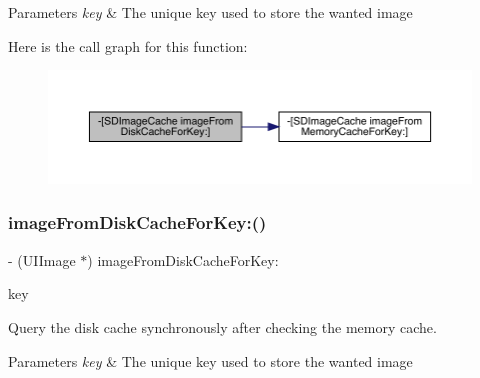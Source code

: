 \begin{DoxyParams}{Parameters}
{\em key} & The unique key used to store the wanted image \\
\hline
\end{DoxyParams}
Here is the call graph for this function\+:\nopagebreak
\begin{figure}[H]
\begin{center}
\leavevmode
\includegraphics[width=350pt]{interface_s_d_image_cache_ad3502d702952c60cd046ba4e7cba0197_cgraph}
\end{center}
\end{figure}
\mbox{\label{interface_s_d_image_cache_ad3502d702952c60cd046ba4e7cba0197}} 
\subsubsection{\texorpdfstring{image\+From\+Disk\+Cache\+For\+Key\+:()}{imageFromDiskCacheForKey:()}\hspace{0.1cm}{\footnotesize\ttfamily [2/3]}}
{\footnotesize\ttfamily -\/ (U\+I\+Image $\ast$) image\+From\+Disk\+Cache\+For\+Key\+: \begin{DoxyParamCaption}\item[{(N\+S\+String $\ast$)}]{key }\end{DoxyParamCaption}}

Query the disk cache synchronously after checking the memory cache.


\begin{DoxyParams}{Parameters}
{\em key} & The unique key used to store the wanted image \\
\hline
\end{DoxyParams}
\mbox{\label{interface_s_d_image_cache_ad3502d702952c60cd046ba4e7cba0197}} 
